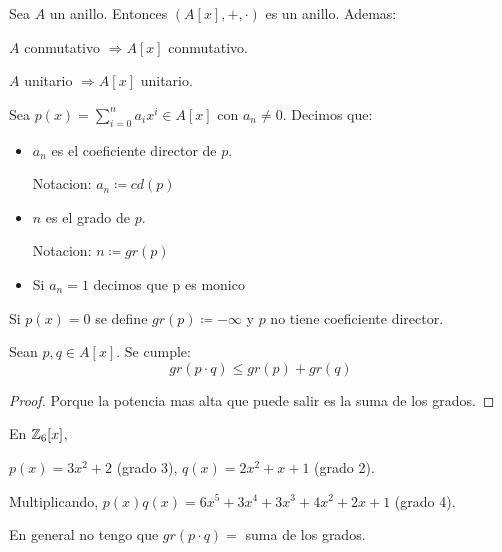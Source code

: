 \begin{proposition}
	Sea \(A \) un anillo. Entonces \((A[x], +, \cdot )\) es un anillo. Ademas:
	
	\(A \) conmutativo \(\Rightarrow A[x ]\) conmutativo.
	
	\(A \) unitario \(\Rightarrow A[x ]\) unitario.
\end{proposition}
\begin{definition}
	Sea \(p(x) = \sum_{i=0 }^{n } a_i x^{i} \in A[x] \) con \(a_n \neq 0 \). Decimos que:
	\begin{itemize}
		\item \(a_n\) es el coeficiente director de \( p \).
		      
		      Notacion: \(a_n \coloneqq cd(p )\)
		      
		\item \(n \) es el grado de \(p \).
		      
		      Notacion: \(n \coloneqq gr(p )\)
		      
		\item Si \(a_n = 1\) decimos que p es monico
	\end{itemize}
	Si \(p(x) = 0 \) se define \(gr(p) \coloneqq -\infty \) y \(p \) no tiene coeficiente director.
\end{definition}
\begin{proposition}
	Sean \(p,q \in A[x ]\). Se cumple:
	\[
		gr(p \cdot q) \leq gr(p) + gr(q )
	\]
\end{proposition}
\begin{proof}
	Porque la potencia mas alta que puede salir es la suma de los grados.
\end{proof}
\begin{example}
	En \(\mathbb{Z}_6[x ]\),
	
	\(p(x) = 3x^{2} + 2 \) (grado 3), \(q(x) = 2x^{2} + x + 1 \) (grado 2).
	
	Multiplicando, \(p(x)q(x) = 6x^{5} + 3x^{4} + 3x^{3} + 4x^{2} + 2x + 1\) (grado 4).
	
	En general no tengo que \(gr(p \cdot q) = \) suma de los grados.
\end{example}

